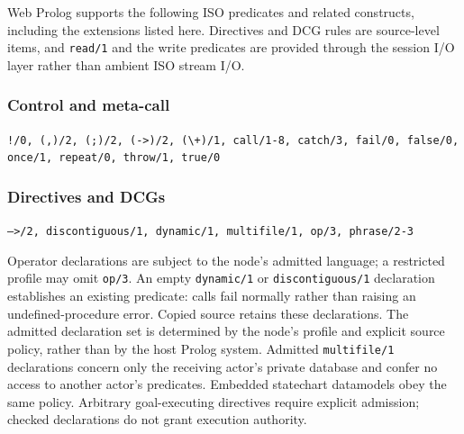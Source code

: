Web Prolog supports the following ISO predicates and related constructs,
including the extensions listed here. Directives and DCG rules are
source-level items, and \texttt{read/\allowbreak{}1} and the write predicates are provided
through the session I/O layer rather than ambient ISO stream I/O.

\vspace{-4mm}
\subsubsection*{Control and meta-call}\vspace{-2mm}
{\raggedright \texttt{!/\allowbreak{}0,\allowbreak{} (\allowbreak{},\allowbreak{})/\allowbreak{}2,\allowbreak{} (\allowbreak{};)/\allowbreak{}2,\allowbreak{} (\allowbreak{}->)/\allowbreak{}2,\allowbreak{} (\allowbreak{}\textbackslash+)/\allowbreak{}1,\allowbreak{} call/\allowbreak{}1-8,\allowbreak{} catch/\allowbreak{}3,\allowbreak{} fail/\allowbreak{}0,\allowbreak{} false/\allowbreak{}0,\allowbreak{} once/\allowbreak{}1,\allowbreak{} repeat/\allowbreak{}0,\allowbreak{} throw/\allowbreak{}1,\allowbreak{} true/\allowbreak{}0}\par}
\vspace{-4mm}
\subsubsection*{Directives and DCGs}\vspace{-2mm}
{\raggedright \texttt{-->/\allowbreak{}2,\allowbreak{} discontiguous/\allowbreak{}1,\allowbreak{} dynamic/\allowbreak{}1,\allowbreak{} multifile/\allowbreak{}1,\allowbreak{} op/\allowbreak{}3,\allowbreak{} phrase/\allowbreak{}2-3}\par}
\noindent Operator declarations are subject to the node's admitted language;
a restricted profile may omit \texttt{op/\allowbreak{}3}.
An empty \texttt{dynamic/\allowbreak{}1} or \texttt{discontiguous/\allowbreak{}1} declaration establishes an existing
predicate: calls fail normally rather than raising an undefined-procedure error. Copied source
retains these declarations. The admitted declaration set is determined by
the node's profile and explicit source policy, rather than by the host Prolog
system. Admitted \texttt{multifile/1} declarations concern only the receiving
actor's private database and confer no access to another actor's predicates.
Embedded statechart datamodels obey the same policy. Arbitrary goal-executing
directives require explicit admission; checked declarations do not grant
execution authority.

